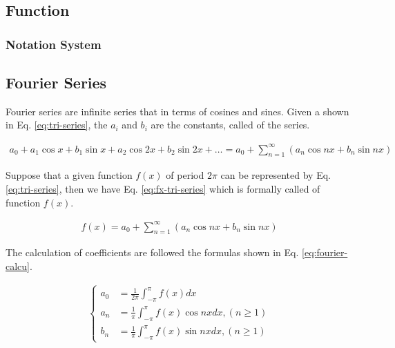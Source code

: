 \subsection{Function}

\subsubsection{Notation System}

\subsection{Fourier Series}

Fourier series are infinite series that  in terms of cosines and sines.
Given a  shown in Eq. \ref{eq:tri-series}, the $a_i$ and $b_i$ are the constants, called  of the series.

\begin{align}
  a_0 + a_1 \cos x + b_1 \sin x + a_2 \cos 2x + b_2 \sin 2x + \dots = a_0 + \sum^\infty_{n=1}(a_n \cos nx + b_n \sin nx)
  \label{eq:tri-series}
\end{align}

Suppose that a given function $f(x)$ of period $2\pi$ can be represented by Eq. \ref{eq:tri-series}, then we have Eq. \ref{eq:fx-tri-series} which is formally called  of function $f(x)$.

\begin{align}
  f(x) = a_0 + \sum^\infty_{n=1}(a_n \cos nx + b_n \sin nx)
  \label{eq:fx-tri-series}
\end{align}

The calculation of coefficients are followed the formulas shown in Eq. \ref{eq:fourier-calcu}.

\begin{align}
  \begin{cases}
    a_0 &= \frac{1}{2\pi}\int_{-\pi}^{\pi} f(x) dx \\
    a_n &= \frac{1}{\pi}\int_{-\pi}^{\pi} f(x)\cos nx dx, (n \geq 1) \\
    b_n &= \frac{1}{\pi}\int_{-\pi}^{\pi} f(x)\sin nx dx, (n \geq 1)
  \end{cases}
  \label{eq:fourier-calcu}
\end{align}